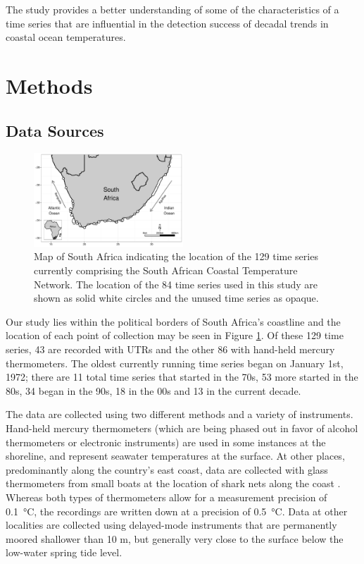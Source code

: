 \documentclass[twocol]{ametsoc}
\begin{document}
The study provides a better understanding of some of the characteristics of a time series that are influential in the detection success of decadal trends in coastal ocean temperatures.

\section{Methods}

\subsection{Data Sources}
\begin{figure}
\centering \includegraphics[width=0.50\textwidth]{figure01}
\caption{Map of South Africa indicating the location of the 129 time series currently comprising the South African Coastal Temperature Network. The location of the 84 time series used in this study are shown as solid white circles and the unused time series as opaque.}
\label{figure01}
\end{figure}

Our study lies within the political borders of South Africa's coastline and the location of each point of collection may be seen in Figure \ref{figure01}. Of these 129 time series, 43 are recorded with UTRs and the other 86 with hand-held mercury thermometers. The oldest currently running time series began on January 1st, 1972; there are 11 total time series that started in the 70s, 53 more started in the 80s, 34 began in the 90s, 18 in the 00s and 13 in the current decade.

The data are collected using two different methods and a variety of instruments. Hand-held mercury thermometers (which are being phased out in favor of alcohol thermometers or electronic instruments) are used in some instances at the shoreline, and represent seawater temperatures at the surface. At other places, predominantly along the country's east coast, data are collected with glass thermometers from small boats at the location of shark nets along the coast \citep{Cliff1988}. Whereas both types of thermometers allow for a measurement precision of \SI{0.1}{\degreeCelsius}, the recordings are written down at a precision of \SI{0.5}{\degreeCelsius}. Data at other localities are collected using delayed-mode instruments that are permanently moored shallower than 10 m, but generally very close to the surface below the low-water spring tide level.
\end{document}
